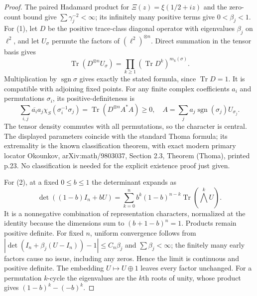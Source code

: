 \begin{proof}
The paired Hadamard product for $\Xi(z)=\xi(1/2+iz)$ and the zero-count
bound give $\sum\gamma_j^{-2}<\infty$; its infinitely many positive
terms give $0<\beta_j<1$.
For (1), let $D$ be the positive trace-class diagonal operator with
eigenvalues $\beta_j$ on $\ell^2$, and let $U_\sigma$ permute the
factors of $(\ell^2)^{\otimes n}$. Direct summation in the tensor basis
gives
\[
 \operatorname{Tr}(D^{\otimes n}U_\sigma)
 =\prod_{k\ge1}(\operatorname{Tr}D^k)^{m_k(\sigma)}.
\]
Multiplication by $\operatorname{sgn}\sigma$ gives exactly the stated
formula, since $\operatorname{Tr}D=1$. It is compatible with adjoining
fixed points. For any finite complex coefficients $a_i$ and permutations
$\sigma_i$, its positive-definiteness is
\[
 \sum_{i,j}\overline{a_i}a_j\chi_S(\sigma_i^{-1}\sigma_j)
 =\operatorname{Tr}(D^{\otimes n}A^*A)\ge0,
 \quad A=\sum_j a_j\operatorname{sgn}(\sigma_j)U_{\sigma_j}.
\]
The tensor density commutes with all permutations, so the character is
central. The displayed parameters coincide with the standard Thoma
formula; its extremality is the known classification theorem, with exact
modern primary locator Okounkov, arXiv:math/9803037, Section 2.3,
Theorem (Thoma), printed p.23. No classification is needed for the
explicit existence proof just given.

For (2), at a fixed $0\le b\le1$ the determinant expands as
\[
 \det((1-b)I_n+bU)
 =\sum_{k=0}^n b^k(1-b)^{n-k}\operatorname{Tr}(\bigwedge^kU).
\]
It is a nonnegative combination of representation characters, normalized
at the identity because the dimensions sum to $(b+1-b)^n=1$.
Products remain positive definite. For fixed $n$, uniform convergence
follows from $|\det(I_n+\beta_j(U-I_n))-1|\le C_n\beta_j$ and
$\sum\beta_j<\infty$; the finitely many early factors cause no issue,
including any zeros. Hence the limit is continuous and positive
definite. The embedding $U\mapsto U\oplus1$ leaves every factor
unchanged. For a permutation $k$-cycle the eigenvalues are the $k$th
roots of unity, whose product gives $(1-b)^k-(-b)^k$.


\end{proof}
